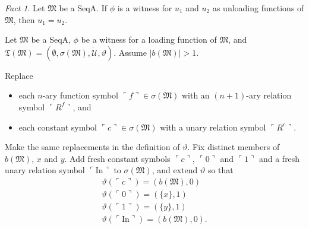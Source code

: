 \documentclass[12pt, twoside]{memoir}
\numberwithin{equation}{section}
\theoremstyle{definition}
\theoremstyle{remark}
\newtheorem{fact}[thm]{Fact}
\theoremstyle{definition}
\theoremstyle{definition}
\theoremstyle{definition}
\theoremstyle{remark}
\begin{document}
\begin{fact}\label{fact216}
Let $\mathfrak{M}$ be a SeqA. If $\phi$ is a witness for $u_1$ and $u_2$ as unloading functions of $\mathfrak{M}$, then $u_1 = u_2$.
\end{fact}

Let $\mathfrak{M}$ be a SeqA, $\phi$ be a witness for a loading function of $\mathfrak{M}$, and $\mathfrak{T}(\mathfrak{M}) = (\emptyset, \sigma(\mathfrak{M}), \dot{\mathcal{U}}, \vartheta)$. Assume $|b(\mathfrak{M})| > 1$. 

Replace
\begin{itemize}
    \item each $n$-ary function symbol $\ulcorner f \urcorner \in \sigma(\mathfrak{M})$ with an $(n+1)$-ary relation symbol $\ulcorner R^f \urcorner$, and
    \item each constant symbol $\ulcorner c \urcorner \in \sigma(\mathfrak{M})$ with a unary relation symbol $\ulcorner R^c \urcorner$.
\end{itemize}
Make the same replacements in the definition of $\vartheta$. Fix distinct members of $b(\mathfrak{M})$, $x$ and $y$. Add fresh constant symbols $\ulcorner c \urcorner$, $\ulcorner 0 \urcorner$ and $\ulcorner 1 \urcorner$ and a fresh unary relation symbol $\ulcorner \mathrm{In} \urcorner$ to $\sigma(\mathfrak{M})$, and extend $\vartheta$ so that
\begin{gather*}
    \vartheta(\ulcorner c \urcorner) = (b(\mathfrak{M}), 0) \\
    \vartheta(\ulcorner 0 \urcorner) = (\{x\}, 1) \\
    \vartheta(\ulcorner 1 \urcorner) = (\{y\}, 1) \\
    \vartheta(\ulcorner \mathrm{In} \urcorner) = (b(\mathfrak{M}), 0) \text{.}
\end{gather*}
\end{document}
